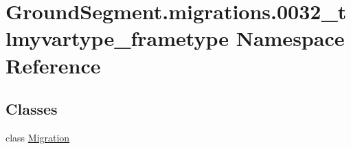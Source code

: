 \hypertarget{namespace_ground_segment_1_1migrations_1_10032__tlmyvartype__frametype}{}\section{Ground\+Segment.\+migrations.0032\+\_\+tlmyvartype\+\_\+frametype Namespace Reference}
\label{namespace_ground_segment_1_1migrations_1_10032__tlmyvartype__frametype}
\subsection*{Classes}
\begin{DoxyCompactItemize}
\item 
class \hyperlink{class_ground_segment_1_1migrations_1_10032__tlmyvartype__frametype_1_1_migration}{Migration}
\end{DoxyCompactItemize}
